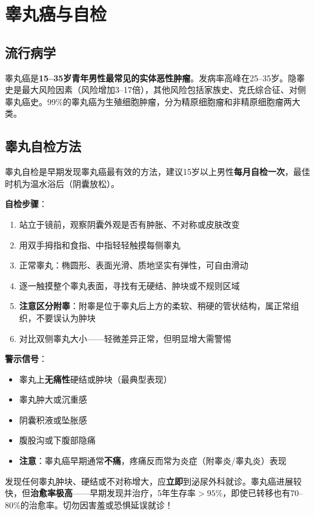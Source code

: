 \section{睾丸癌与自检}
\label{sec:testicular_cancer}

\subsection{流行病学}

睾丸癌是\textbf{15--35岁青年男性最常见的实体恶性肿瘤}。发病率高峰在25--35岁。隐睾史是最大风险因素（风险增加3--17倍），其他风险包括家族史、克氏综合征、对侧睾丸癌史。99\%的睾丸癌为生殖细胞肿瘤，分为精原细胞瘤和非精原细胞瘤两大类。

\subsection{睾丸自检方法}

睾丸自检是早期发现睾丸癌最有效的方法，建议15岁以上男性\textbf{每月自检一次}，最佳时机为温水浴后（阴囊放松）。

\textbf{自检步骤}：
\begin{enumerate}
	\item 站立于镜前，观察阴囊外观是否有肿胀、不对称或皮肤改变
	\item 用双手拇指和食指、中指轻轻触摸每侧睾丸
	\item 正常睾丸：椭圆形、表面光滑、质地坚实有弹性，可自由滑动
	\item 逐一触摸整个睾丸表面，寻找有无硬结、肿块或不规则区域
	\item \textbf{注意区分附睾}：附睾是位于睾丸后上方的柔软、稍硬的管状结构，属正常组织，不要误认为肿块
	\item 对比双侧睾丸大小——轻微差异正常，但明显增大需警惕
\end{enumerate}

\textbf{警示信号}：
\begin{itemize}[leftmargin=2cm]
	\item 睾丸上\textbf{无痛性}硬结或肿块（最典型表现）
	\item 睾丸肿大或沉重感
	\item 阴囊积液或坠胀感
	\item 腹股沟或下腹部隐痛
	\item \textbf{注意}：睾丸癌早期通常\textbf{不痛}，疼痛反而常为炎症（附睾炎/睾丸炎）表现
\end{itemize}

\begin{tcolorbox}[colback=pink!5!white,colframe=red!50!black,title=贴心小叮咛]
发现任何睾丸肿块、硬结或不对称增大，应\textbf{立即}到泌尿外科就诊。睾丸癌进展较快，但\textbf{治愈率极高}——早期发现并治疗，5年生存率$>95\%$，即使已转移也有$70$--$80\%$的治愈率。切勿因害羞或恐惧延误就诊！
\end{tcolorbox}

